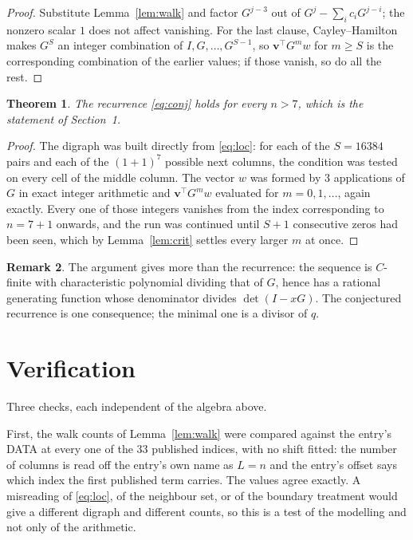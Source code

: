 \documentclass[11pt,a4paper]{article}
\theoremstyle{plain}
\newtheorem{theorem}{Theorem}
\theoremstyle{definition}
\newtheorem{remark}[theorem]{Remark}
\begin{document}
\begin{proof}
Substitute Lemma~\ref{lem:walk} and factor $G^{j-3}$ out of
$G^{j}-\sum_ic_iG^{j-i}$; the nonzero scalar $1$ does not affect
vanishing. For the last clause, Cayley--Hamilton makes $G^{S}$ an integer combination of
$I,G,\dots,G^{S-1}$, so $\mathbf{v}^{\!\top}G^{m}w$ for $m\ge S$ is the corresponding
combination of the earlier values; if those vanish, so do all the rest.
\end{proof}

\begin{theorem}
The recurrence \eqref{eq:conj} holds for every $n>7$, which is the statement of
Section~1.
\end{theorem}

\begin{proof}
The digraph was built directly from \eqref{eq:loc}: for each of the $S=16384$ pairs and each
of the $(1+1)^{7}$ possible next columns, the condition was tested on every cell of
the middle column. The vector $w$ was formed by $3$ applications of $G$ in exact integer
arithmetic and $\mathbf{v}^{\!\top}G^{m}w$ evaluated for $m=0,1,\dots$, again exactly.
Every one of those integers vanishes from the index corresponding to $n=7+1$ onwards,
and the run was continued until $S+1$ consecutive zeros had been seen, which by
Lemma~\ref{lem:crit} settles every larger $m$ at once.
\end{proof}

\begin{remark}
The argument gives more than the recurrence: the sequence is $C$-finite with characteristic
polynomial dividing that of $G$, hence has a rational generating function whose denominator
divides $\det(I-xG)$. The conjectured recurrence is one consequence; the minimal one is a
divisor of $q$.
\end{remark}

\section{Verification}

Three checks, each independent of the algebra above.

First, the walk counts of Lemma~\ref{lem:walk} were compared against the entry's DATA at
every one of the $33$ published indices, with no shift fitted: the number of columns is
read off the entry's own name as $L=n$ and the entry's offset says which index the first
published term carries. The values agree exactly. A misreading of \eqref{eq:loc}, of the
neighbour set, or of the boundary treatment would give a different digraph and different
counts, so this is a test of the modelling and not only of the arithmetic.
\end{document}
